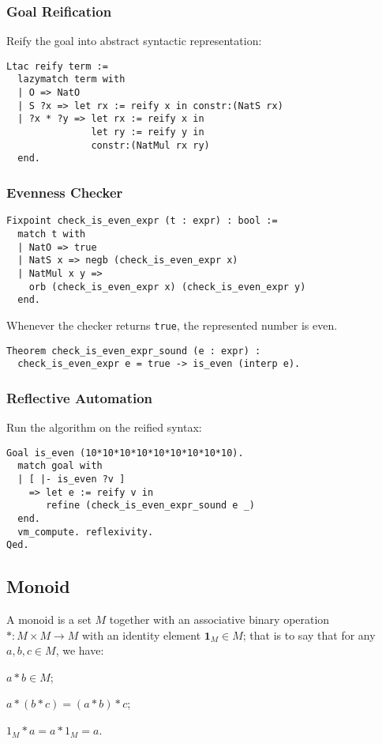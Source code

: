 \documentclass{beamer}
\begin{document}
\begin{frame}[fragile]
  \frametitle{Goal Reification}
  Reify the goal into abstract syntactic representation:
\begin{verbatim}
Ltac reify term :=
  lazymatch term with
  | O => NatO
  | S ?x => let rx := reify x in constr:(NatS rx)
  | ?x * ?y => let rx := reify x in
               let ry := reify y in
               constr:(NatMul rx ry)
  end.
\end{verbatim}
\end{frame}

\begin{frame}[fragile]
\frametitle{Evenness Checker}
\begin{verbatim}
Fixpoint check_is_even_expr (t : expr) : bool :=
  match t with
  | NatO => true
  | NatS x => negb (check_is_even_expr x)
  | NatMul x y =>
    orb (check_is_even_expr x) (check_is_even_expr y)
  end.
\end{verbatim}
  Whenever the checker returns \texttt{true}, the represented number is even.
\begin{verbatim}
Theorem check_is_even_expr_sound (e : expr) :
  check_is_even_expr e = true -> is_even (interp e).
\end{verbatim}
\end{frame}

\begin{frame}[fragile]
  \frametitle{Reflective Automation}
  Run the algorithm on the reified syntax:
\begin{verbatim}
Goal is_even (10*10*10*10*10*10*10*10*10).
  match goal with
  | [ |- is_even ?v ]
    => let e := reify v in
       refine (check_is_even_expr_sound e _)
  end.
  vm_compute. reflexivity.
Qed.
\end{verbatim}
\end{frame}

\begin{frame}\justifying
  \section{Monoid}
  A monoid is a set $M$ together with an associative binary operation $\ast: M \times M \to M$ with an identity element $\boldsymbol{1}_M \in M$; that is to say that for any $a, b, c \in M$, we have:
  \begin{description}[leftmargin=0pt]
  \item[Closure] $a \ast b \in M$;
  \item[Associativity] $a \ast (b \ast c) = (a \ast b) \ast c$;
  \item[Identity] $1_M \ast a = a \ast 1_M = a$.
  \end{description}
\end{frame}
\end{document}
